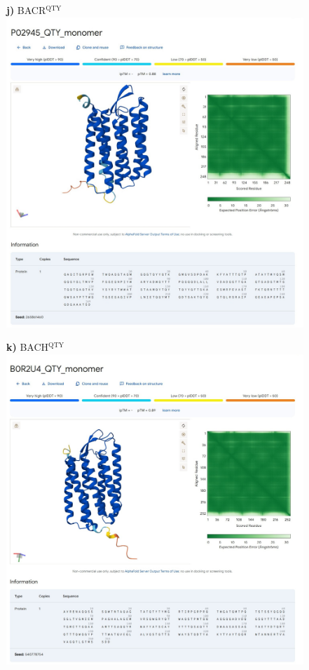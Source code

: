 \documentclass[fleqn,12pt]{supp}
\begin{document}
\newpage
\begin{figure}[H]
    \textbf{j)} BACR$^{\textrm{QTY}}$ \\
    \includegraphics[width=\linewidth]{SuppFigures/af3 bacr qty mono.jpg}
\end{figure}

\newpage
\begin{figure}[H]
    \textbf{k)} BACH$^{\textrm{QTY}}$ \\
    \includegraphics[width=\linewidth]{SuppFigures/af3 bach qty mono.jpg}
\end{figure}
\end{document}
